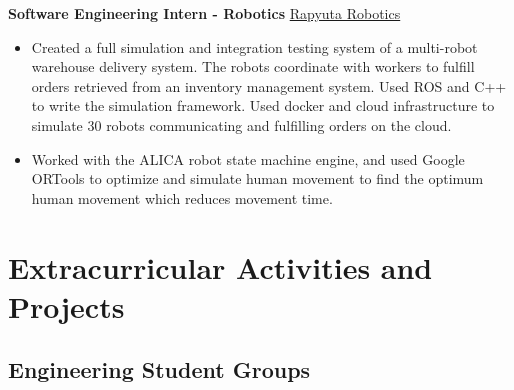 \documentclass[10pt, a4paper]{cv}
\begin{document}
{	\textbf{Software Engineering Intern - Robotics} \hfill \href{https://www.rapyuta-robotics.com}{Rapyuta Robotics}
	\begin{itemize}
		\item Created a full simulation and integration testing system of a multi-robot warehouse delivery system. The robots coordinate with workers to fulfill orders retrieved from an inventory management system. Used ROS and C++ to write the simulation framework. Used docker and cloud infrastructure to simulate 30 robots communicating and fulfilling orders on the cloud.
		\item Worked with the ALICA robot state machine engine, and used Google ORTools to optimize and simulate human movement to find the optimum human movement which reduces movement time.
	\end{itemize}

%

\section*{Extracurricular Activities and Projects}

\subsection*{Engineering Student Groups}\noindent

}
\end{document}
